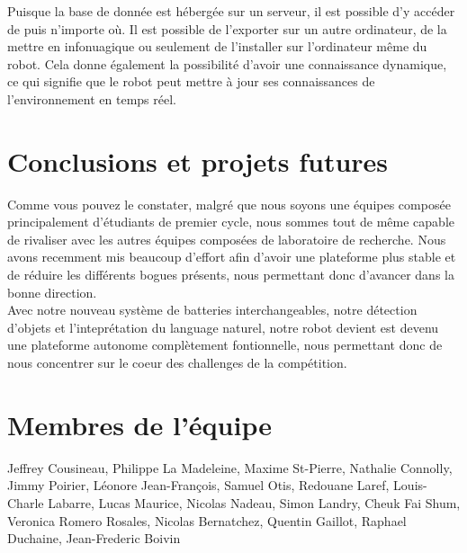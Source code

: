 \documentclass[runningheads,a4paper]{llncs}
\begin{document}
Puisque la base de donnée est hébergée sur un serveur, il est possible d'y accéder de puis n'importe où. Il est possible de l'exporter sur un autre ordinateur, de la mettre en infonuagique ou seulement de l'installer sur l'ordinateur même du robot. Cela donne également la possibilité d'avoir une connaissance dynamique, ce qui signifie que le robot peut mettre à jour ses connaissances de l'environnement en temps réel.\\



\section{Conclusions et projets futures} 
Comme vous pouvez le constater, malgré que nous soyons une équipes composée principalement d'étudiants de premier cycle, nous sommes tout de même capable de rivaliser avec les autres équipes composées de laboratoire de recherche. Nous avons recemment mis beaucoup d'effort afin d'avoir une plateforme plus stable et de réduire les différents bogues présents, nous permettant donc d'avancer dans la bonne direction. \\

Avec notre nouveau système de batteries interchangeables, notre détection d'objets et l'inteprétation du language naturel, notre robot devient est devenu une plateforme autonome complètement fontionnelle, nous permettant donc de nous concentrer sur le coeur des challenges de la compétition.\\


	

\section*{Membres de l'équipe}
Jeffrey Cousineau, Philippe La Madeleine, Maxime St-Pierre, Nathalie Connolly, Jimmy Poirier, Léonore Jean-François, Samuel Otis, Redouane Laref, Louis-Charle Labarre, Lucas Maurice, Nicolas Nadeau, Simon Landry, Cheuk Fai Shum, Veronica Romero Rosales, Nicolas Bernatchez, Quentin Gaillot, Raphael Duchaine, Jean-Frederic Boivin 

\nocite{*}


\end{document}
